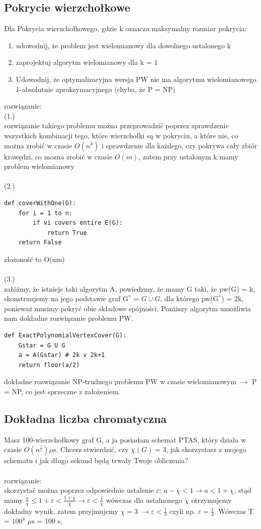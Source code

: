 \documentclass{article}
\begin{document}
\subsection*{Pokrycie wierzchołkowe}
Dla Pokrycia wierzchołkowego, gdzie k oznacza maksymalny rozmiar pokrycia:
\begin{enumerate}
	\item udowodnij, że problem jest wielomianowy dla dowolnego ustalonego k
	\item zaprojektuj algorytm wielomianowy dla k = 1
	\item Udowodnij, że optymalizacyjna wersja PW nie ma algorytmu wielomianowego 1-absolutnie aproksymacyjnego (chyba, że P = NP)
\end{enumerate}
rozwiązanie: \\
(1.) \\
rozwiązanie takiego problemu można przeprowadzić poprzez
sprawdzenie wszystkich kombinacji tego, które wierzchołki są w pokryciu,
a które nie, co można zrobić w czasie $O(n^k)$ i sprawdzenie dla każdego, czy 
pokrywa cały zbiór krawędzi, co mozna zrobić w czasie $O(m)$, zatem 
przy ustalonym k mamy problem wielomianowy \\\\
(2.) 
\begin{lstlisting}
def coverWithOne(G):
	for i = 1 to n:
		if vi covers entire E(G):
			return True
	return False
\end{lstlisting}
złożoność to O(nm) \\\\
(3.) \\
załóżmy, że istnieje taki algorytm A,  powiedzmy, że mamy G
taki, że pw(G) = k, skonstruujemy na jego podstawie graf G$^*$ = $G \cup G$,
dla którego pw(G$^*$) = 2k, ponieważ musimy pokryć obie składowe spójności.
Poniższy algorytm umożliwia nam dokładne rozwiązanie problemu PW.
\begin{lstlisting}
def ExactPolynomialVertexCover(G):
	Gstar = G U G
	a = A(Gstar) # 2k v 2k+1
	return floor(a/2)
\end{lstlisting}
dokładne rozwiązanie NP-trudnego problemu PW w czasie wielomianowym 
$\rightarrow$ P = NP, co jest sprzeczne z założeniem.

\subsection*{Dokładna liczba chromatyczna}
Masz 100-wierzchołkowy graf G, a ja posiadam schemat PTAS, który działa w czasie
$O(n^{\frac{1}{\varepsilon}}) \mu$s. Chcesz stwierdzić, czy $\chi(G) = 3$, 
jak skorzystasz z mojego schematu i jak długo sekund będą trwały Twoje obliczenia?
 \\\\rozwiązanie:\\
skorzystać można poprzez odpowiednie ustalenie $\varepsilon$: 
 $a - \chi < 1 \rightarrow a  < 1 + \chi$, stąd mamy 
$\frac{a}{\chi} \leq 1 + \varepsilon < \frac{1 + \chi}{\chi} \rightarrow \varepsilon < \frac{1}{\chi}$ 
wówczas dla ustalnonego $\chi$ otrzymujemy dokładny wynik, zatem przyjmujemy 
$\chi = 3$ $\rightarrow \varepsilon < \frac{1}{3}$  czyli np. $\varepsilon = \frac{1}{4}$. 
Wówczas T = $100^4$ $\mu$s = $100$ s. 
\end{document}
